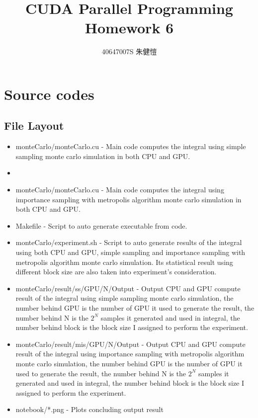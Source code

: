 \documentclass{article}
\title{CUDA Parallel Programming\\Homework 6}
\author{40647007S 朱健愷}
\begin{document}
	\maketitle
	\section{Source codes}
	\subsection{File Layout}
	\begin{itemize}
		\item monteCarlo/monteCarlo.cu - Main code computes the integral using simple sampling monte carlo simulation in both CPU and GPU.
		\item 		\item monteCarlo/monteCarlo.cu - Main code computes the integral using importance sampling with metropolis algorithm monte carlo simulation in both CPU and GPU.
		\item Makefile - Script to auto generate executable from code.
		\item monteCarlo/experiment.sh - Script to auto generate results of the integral using both CPU and GPU, simple sampling and importance sampling with metropolis algorithm monte carlo simulation. Its statistical result using different block size are also taken into experiment's consideration.
		\item monteCarlo/result/ss/GPU\textunderscore*/N\textunderscore{*}\textunderscore*/Output - Output CPU and GPU compute result of the integral using simple sampling monte carlo simulation, the number behind GPU is the number of GPU it used to generate the result, the number behind N is the $2^N$ samples it generated and used in integral, the number behind block is the block size I assigned to perform the experiment.
		\item monteCarlo/result/mis/GPU\textunderscore*/N\textunderscore{*}\textunderscore*/Output - Output CPU and GPU compute result of the integral using importance sampling with metropolis algorithm monte carlo simulation, the number behind GPU is the number of GPU it used to generate the result, the number behind N is the $2^N$ samples it generated and used in integral, the number behind block is the block size I assigned to perform the experiment.		
		\item notebook/*.png - Plots concluding output result
	\end{itemize}
	
\end{document}
